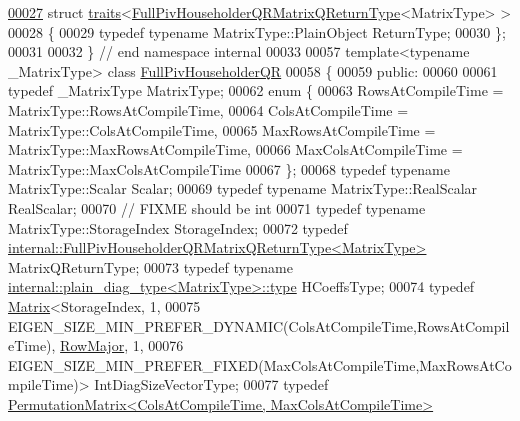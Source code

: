 \begin{DoxyCode}
\hyperlink{struct_eigen_1_1internal_1_1traits_3_01_full_piv_householder_q_r_matrix_q_return_type_3_01_matrix_type_01_4_01_4}{00027} \textcolor{keyword}{struct }\hyperlink{struct_eigen_1_1internal_1_1traits}{traits}<\hyperlink{group___q_r___module_struct_eigen_1_1internal_1_1_full_piv_householder_q_r_matrix_q_return_type}{FullPivHouseholderQRMatrixQReturnType}<MatrixType> 
      >
00028 \{
00029   \textcolor{keyword}{typedef} \textcolor{keyword}{typename} MatrixType::PlainObject ReturnType;
00030 \};
00031 
00032 \} \textcolor{comment}{// end namespace internal}
00033 
00057 \textcolor{keyword}{template}<\textcolor{keyword}{typename} \_MatrixType> \textcolor{keyword}{class }\hyperlink{group___q_r___module_class_eigen_1_1_full_piv_householder_q_r}{FullPivHouseholderQR}
00058 \{
00059   \textcolor{keyword}{public}:
00060 
00061     \textcolor{keyword}{typedef} \_MatrixType MatrixType;
00062     \textcolor{keyword}{enum} \{
00063       RowsAtCompileTime = MatrixType::RowsAtCompileTime,
00064       ColsAtCompileTime = MatrixType::ColsAtCompileTime,
00065       MaxRowsAtCompileTime = MatrixType::MaxRowsAtCompileTime,
00066       MaxColsAtCompileTime = MatrixType::MaxColsAtCompileTime
00067     \};
00068     \textcolor{keyword}{typedef} \textcolor{keyword}{typename} MatrixType::Scalar Scalar;
00069     \textcolor{keyword}{typedef} \textcolor{keyword}{typename} MatrixType::RealScalar RealScalar;
00070     \textcolor{comment}{// FIXME should be int}
00071     \textcolor{keyword}{typedef} \textcolor{keyword}{typename} MatrixType::StorageIndex StorageIndex;
00072     \textcolor{keyword}{typedef} \hyperlink{group___q_r___module_struct_eigen_1_1internal_1_1_full_piv_householder_q_r_matrix_q_return_type}{internal::FullPivHouseholderQRMatrixQReturnType<MatrixType>}
       MatrixQReturnType;
00073     \textcolor{keyword}{typedef} \textcolor{keyword}{typename} \hyperlink{class_eigen_1_1internal_1_1_tensor_lazy_evaluator_writable}{internal::plain\_diag\_type<MatrixType>::type}
       HCoeffsType;
00074     \textcolor{keyword}{typedef} \hyperlink{group___core___module_class_eigen_1_1_matrix}{Matrix}<StorageIndex, 1,
00075                    EIGEN\_SIZE\_MIN\_PREFER\_DYNAMIC(ColsAtCompileTime,RowsAtCompileTime), 
      \hyperlink{group__enums_ggaacded1a18ae58b0f554751f6cdf9eb13acfcde9cd8677c5f7caf6bd603666aae3}{RowMajor}, 1,
00076                    EIGEN\_SIZE\_MIN\_PREFER\_FIXED(MaxColsAtCompileTime,MaxRowsAtCompileTime)> 
      IntDiagSizeVectorType;
00077     \textcolor{keyword}{typedef} \hyperlink{group___core___module}{PermutationMatrix<ColsAtCompileTime, MaxColsAtCompileTime>}

\end{DoxyCode}
